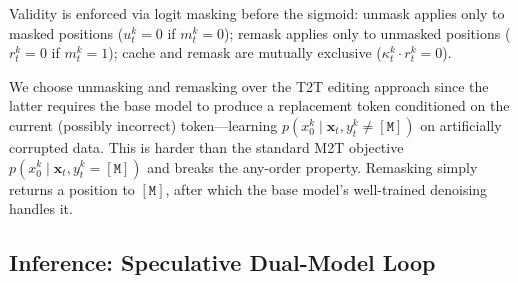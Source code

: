 \documentclass[11pt]{article}
\newcommand{\bx}{\mathbf{x}}
\newcommand{\mask}{\ensuremath{\mathtt{[M]}}}
\begin{document}
Validity is enforced via logit masking before the sigmoid:
unmask applies only to masked positions ($u_t^k = 0$ if $m_t^k = 0$);
remask applies only to unmasked positions ($r_t^k = 0$ if $m_t^k = 1$);
cache and remask are mutually exclusive ($\kappa_t^k \cdot r_t^k = 0$).

We choose unmasking and remasking over the T2T editing approach since the latter requires the base model to produce a replacement token conditioned on the current (possibly incorrect) token---learning $p(x_0^k \mid \bx_t, y_t^k \neq \mask)$ on artificially corrupted data.
This is harder than the standard M2T objective $p(x_0^k \mid \bx_t, y_t^k = \mask)$ and breaks the any-order property.
Remasking simply returns a position to $\mask$, after which the base model's well-trained denoising handles it.

\subsection{Inference: Speculative Dual-Model Loop}
\label{sec:transition}
\end{document}
